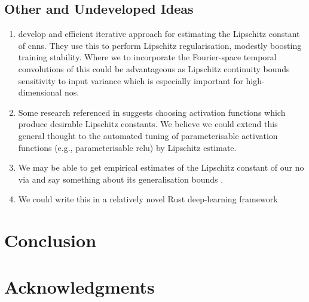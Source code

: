 \documentclass{article}
\begin{document}
\subsection{Other and Undeveloped Ideas}
\begin{enumerate}
    \item \textcite{delattre_efficient_2023} develop and efficient iterative approach for estimating the Lipschitz constant of \glspl{cnn}. They use this to perform Lipschitz regularisation, modestly boosting training stability. Where we to incorporate the Fourier-space temporal convolutions of \cite{xu_equivariant_2024} this could be advantageous as Lipschitz continuity bounds sensitivity to input variance which is especially important for high-dimensional \glspl{no}.
    \item Some research referenced in \textcite{le_mathematical_2024} suggests choosing activation functions which produce desirable Lipschitz constants. We believe we could extend this general thought to the automated tuning of parameterisable activation functions (e.g., parameterisable \gls{relu}) by Lipschitz estimate.
    \item We may be able to get empirical estimates of the Lipschitz constant of our \gls{no} via \cite{delattre_efficient_2023} and say something about its generalisation bounds \cite{le_mathematical_2024}.
    \item We could write this in a relatively novel Rust deep-learning framework
\end{enumerate}

\section{Conclusion}

\section*{Acknowledgments}

\printbibliography
\printglossaries
\end{document}
